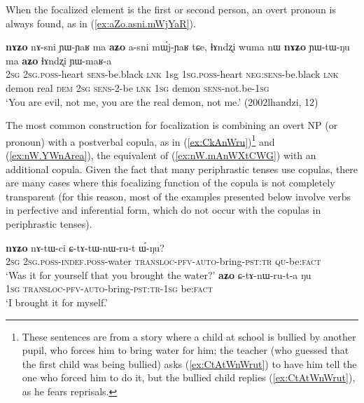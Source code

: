 \documentclass[oneside,a4paper,11pt]{article}
\begin{document}
When the focalized element is the first or second person, an overt pronoun is always found, as in (\ref{ex:aZo.asni.mWjYaR}).

\begin{exe}
\ex \label{ex:aZo.asni.mWjYaR}
\gll \textbf{nɤʑo} nɤ-sni ɲɯ-ɲaʁ ma \textbf{aʑo} a-sni mɯ́j-ɲaʁ tɕe, ɬɤndʐi wuma nɯ \textbf{nɤʑo} ɲɯ-tɯ-ŋu ma \textbf{aʑo} ɬɤndʐi ɲɯ-maʁ-a \\
\textsc{2sg} \textsc{2sg}.\textsc{poss}-heart \textsc{sens}-be.black \textsc{lnk} 1sg \textsc{1sg}.\textsc{poss}-heart  \textsc{neg}:\textsc{sens}-be.black \textsc{lnk} demon real \textsc{dem} \textsc{2sg} \textsc{sens}-2-be \textsc{lnk} \textsc{1sg} demon \textsc{sens}-not.be-\textsc{1sg} \\
\glt `You are evil, not me, you are the real demon, not me.' (2002lhandzi, 12)
\end{exe}

The most common construction for focalization is combining an overt NP (or pronoun) with a postverbal copula, as in (\ref{ex:CkAnWru})\footnote{These sentences are from a story where a child at school is bullied by another pupil, who forces him to bring water for him; the teacher (who guessed that the first child was being bullied) asks (\ref{ex:CtAtWnWrut}) to have him tell the one who forced him to do it, but the bullied child replies (\ref{ex:CtAtWnWrut}), as he fears reprisals.} and (\ref{ex:nW.YWnArea}), the equivalent of (\ref{ex:nW.mAnWXtCWG}) with an additional copula. Given the fact that many periphrastic tenses use copulas, there are many cases where this focalizing function of the copula is not completely transparent (for this reason, most of the examples presented below involve verbs in perfective and inferential form, which do not occur with the copulas in periphrastic tenses).

\begin{exe}
\ex  \label{ex:CkAnWru}
\begin{xlist}
\ex \label{ex:CtAtWnWrut}
\gll \textbf{nɤʑo} nɤ-tɯ-ci ɕ-tɤ-tɯ-nɯ-ru-t ɯ́-ŋu? \\
\textsc{2sg} \textsc{2sg.poss}-\textsc{indef.poss}-water \textsc{transloc}-\textsc{pfv}-\textsc{auto}-bring-\textsc{pst}:\textsc{tr}  \textsc{qu}-be:\textsc{fact} \\
\glt `Was it for yourself that you brought the water?'
\ex \label{ex:CtAnWruta}
\gll \textbf{aʑo} ɕ-tɤ-nɯ-ru-t-a ŋu \\
\textsc{1sg} \textsc{transloc}-\textsc{pfv}-\textsc{auto}-bring-\textsc{pst}:\textsc{tr}-\textsc{1sg} be:\textsc{fact} \\
\glt `I brought it for myself.'
\end{xlist}
\end{exe}
 
\end{document}
